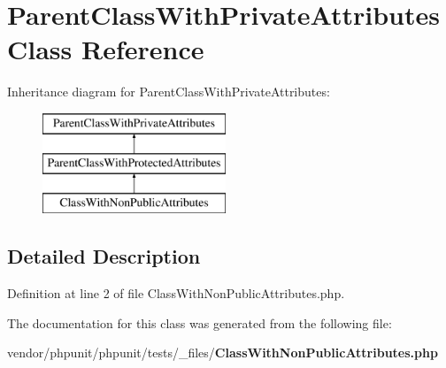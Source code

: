\section{Parent\+Class\+With\+Private\+Attributes Class Reference}
\label{class_parent_class_with_private_attributes}
Inheritance diagram for Parent\+Class\+With\+Private\+Attributes\+:\begin{figure}[H]
\begin{center}
\leavevmode
\includegraphics[height=3.000000cm]{class_parent_class_with_private_attributes}
\end{center}
\end{figure}


\subsection{Detailed Description}


Definition at line 2 of file Class\+With\+Non\+Public\+Attributes.\+php.



The documentation for this class was generated from the following file\+:\begin{DoxyCompactItemize}
\item 
vendor/phpunit/phpunit/tests/\+\_\+files/{\bf Class\+With\+Non\+Public\+Attributes.\+php}\end{DoxyCompactItemize}
